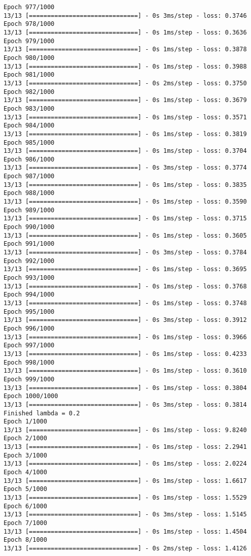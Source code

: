 \documentclass[11pt]{article}
\begin{document}
\begin{Verbatim}[commandchars=\\\{\}]
Epoch 977/1000
13/13 [==============================] - 0s 3ms/step - loss: 0.3746
Epoch 978/1000
13/13 [==============================] - 0s 1ms/step - loss: 0.3636
Epoch 979/1000
13/13 [==============================] - 0s 1ms/step - loss: 0.3878
Epoch 980/1000
13/13 [==============================] - 0s 1ms/step - loss: 0.3988
Epoch 981/1000
13/13 [==============================] - 0s 2ms/step - loss: 0.3750
Epoch 982/1000
13/13 [==============================] - 0s 1ms/step - loss: 0.3679
Epoch 983/1000
13/13 [==============================] - 0s 1ms/step - loss: 0.3571
Epoch 984/1000
13/13 [==============================] - 0s 1ms/step - loss: 0.3819
Epoch 985/1000
13/13 [==============================] - 0s 1ms/step - loss: 0.3704
Epoch 986/1000
13/13 [==============================] - 0s 3ms/step - loss: 0.3774
Epoch 987/1000
13/13 [==============================] - 0s 1ms/step - loss: 0.3835
Epoch 988/1000
13/13 [==============================] - 0s 1ms/step - loss: 0.3590
Epoch 989/1000
13/13 [==============================] - 0s 1ms/step - loss: 0.3715
Epoch 990/1000
13/13 [==============================] - 0s 1ms/step - loss: 0.3605
Epoch 991/1000
13/13 [==============================] - 0s 3ms/step - loss: 0.3784
Epoch 992/1000
13/13 [==============================] - 0s 1ms/step - loss: 0.3695
Epoch 993/1000
13/13 [==============================] - 0s 1ms/step - loss: 0.3768
Epoch 994/1000
13/13 [==============================] - 0s 1ms/step - loss: 0.3748
Epoch 995/1000
13/13 [==============================] - 0s 3ms/step - loss: 0.3912
Epoch 996/1000
13/13 [==============================] - 0s 1ms/step - loss: 0.3966
Epoch 997/1000
13/13 [==============================] - 0s 1ms/step - loss: 0.4233
Epoch 998/1000
13/13 [==============================] - 0s 1ms/step - loss: 0.3610
Epoch 999/1000
13/13 [==============================] - 0s 1ms/step - loss: 0.3804
Epoch 1000/1000
13/13 [==============================] - 0s 3ms/step - loss: 0.3814
Finished lambda = 0.2
Epoch 1/1000
13/13 [==============================] - 0s 1ms/step - loss: 9.8240
Epoch 2/1000
13/13 [==============================] - 0s 1ms/step - loss: 2.2941
Epoch 3/1000
13/13 [==============================] - 0s 1ms/step - loss: 2.0224
Epoch 4/1000
13/13 [==============================] - 0s 1ms/step - loss: 1.6617
Epoch 5/1000
13/13 [==============================] - 0s 1ms/step - loss: 1.5529
Epoch 6/1000
13/13 [==============================] - 0s 3ms/step - loss: 1.5145
Epoch 7/1000
13/13 [==============================] - 0s 1ms/step - loss: 1.4504
Epoch 8/1000
13/13 [==============================] - 0s 2ms/step - loss: 1.4126

\end{Verbatim}
\end{document}
